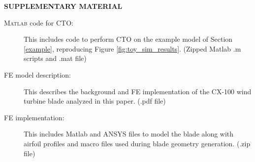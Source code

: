 \documentclass[12pt]{article}
\begin{document}
\bigskip
\begin{center}
{\large\bf SUPPLEMENTARY MATERIAL}
\end{center}

\begin{description}


\item[{\scshape Matlab} code for CTO:] This includes code to perform CTO on the example model of Section \ref{example}, reproducing Figure \ref{fig:toy_sim_results}. (Zipped {Matlab} .m scripts and .mat file)
\item[FE model description:] This describes the background and FE implementation of the CX-100 wind turbine blade analyzed in this paper. (.pdf file)
\item[FE implementation:] This includes Matlab and ANSYS files to model the blade along with airfoil profiles and macro files used during blade geometry generation. (.zip file)


%

\end{description}




\end{document}
